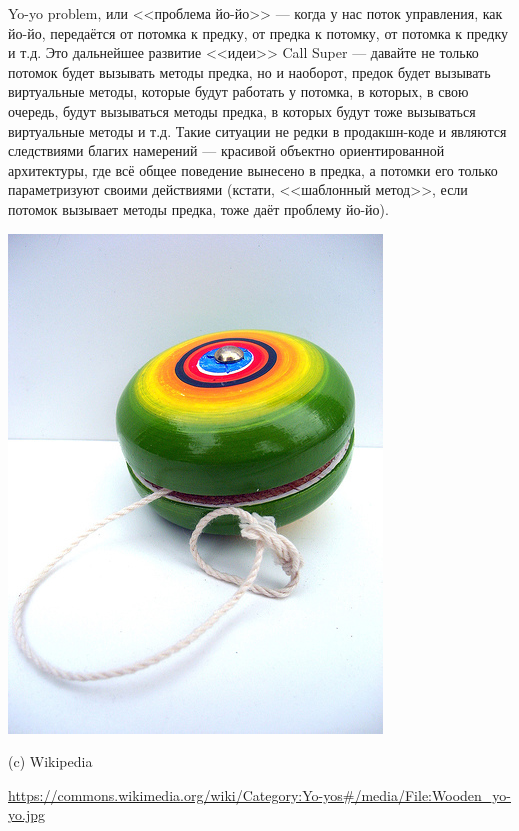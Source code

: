 \documentclass[a5paper]{article}
\newlength\Colsep
\begin{document}
\noindent\begin{minipage}{\textwidth}
    \begin{minipage}[c][6cm][c]{\dimexpr0.7\textwidth-0.5\Colsep\relax}
        Yo-yo problem, или <<проблема йо-йо>> --- когда у нас поток управления, как йо-йо, передаётся от потомка к предку, от предка к потомку, от потомка к предку и т.д. Это дальнейшее развитие <<идеи>> Call Super --- давайте не только потомок будет вызывать методы предка, но и наоборот, предок будет вызывать виртуальные методы, которые будут работать у потомка, в которых, в свою очередь, будут вызываться методы предка, в которых будут тоже вызываться виртуальные методы и т.д. Такие ситуации не редки в продакшн-коде и являются следствиями благих намерений --- красивой объектно ориентированной архитектуры, где всё общее поведение вынесено в предка, а потомки его только параметризуют своими действиями (кстати, <<шаблонный метод>>, если потомок вызывает методы предка, тоже даёт проблему йо-йо).
    \end{minipage}\hfill
    \begin{minipage}[c][6cm][c]{\dimexpr0.3\textwidth-0.5\Colsep\relax}
        \includegraphics[width=\textwidth]{yo-yo.jpg}

        \footnotesize{(c) Wikipedia}

        \tiny{\url{https://commons.wikimedia.org/wiki/Category:Yo-yos\#/media/File:Wooden\_yo-yo.jpg}}
    \end{minipage}%
\end{minipage}
\end{document}

